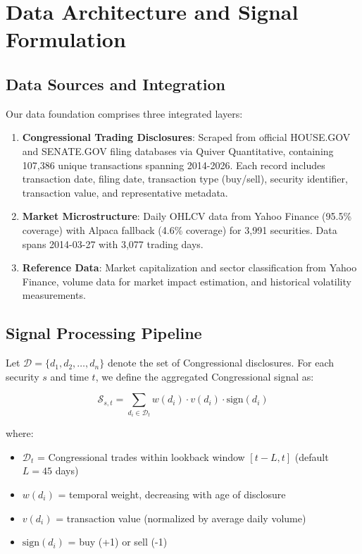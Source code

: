 \documentclass[twocolumn,ieee]{Base_Latex_Template/arithmaxresearch}
\begin{document}
\section{Data Architecture and Signal Formulation}

\subsection{Data Sources and Integration}

Our data foundation comprises three integrated layers:

\begin{enumerate}
\item \textbf{Congressional Trading Disclosures}: Scraped from official HOUSE.GOV and SENATE.GOV filing databases via Quiver Quantitative, containing 107,386 unique transactions spanning 2014-2026. Each record includes transaction date, filing date, transaction type (buy/sell), security identifier, transaction value, and representative metadata.

\item \textbf{Market Microstructure}: Daily OHLCV data from Yahoo Finance (95.5\% coverage) with Alpaca fallback (4.6\% coverage) for 3,991 securities. Data spans 2014-03-27 with 3,077 trading days.

\item \textbf{Reference Data}: Market capitalization and sector classification from Yahoo Finance, volume data for market impact estimation, and historical volatility measurements.
\end{enumerate}

\subsection{Signal Processing Pipeline}

Let $\mathcal{D} = \{d_1, d_2, \ldots, d_n\}$ denote the set of Congressional disclosures. For each security $s$ and time $t$, we define the aggregated Congressional signal as:

$$\mathcal{S}_{s,t} = \sum_{d_i \in \mathcal{D}_t} w(d_i) \cdot v(d_i) \cdot \text{sign}(d_i)$$

where:
\begin{itemize}
\item $\mathcal{D}_t$ = Congressional trades within lookback window $[t - L, t]$ (default $L = 45$ days)
\item $w(d_i)$ = temporal weight, decreasing with age of disclosure
\item $v(d_i)$ = transaction value (normalized by average daily volume)
\item $\text{sign}(d_i)$ = buy (+1) or sell (-1)
\end{itemize}
\end{document}
